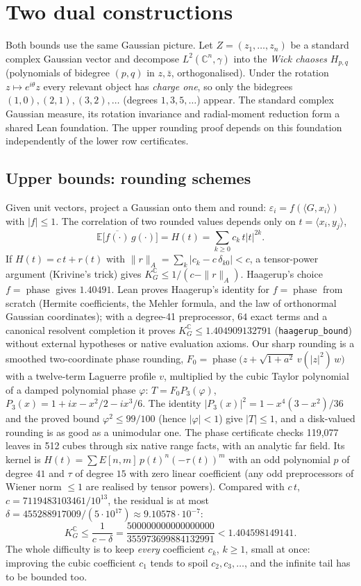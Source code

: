 \documentclass[11pt,a4paper]{article}
\newcommand{\C}{\mathbb{C}}
\newcommand{\E}{\mathbb{E}}
\newcommand{\KG}{K_G^{\C}}
\newcommand{\ph}{\operatorname{phase}}
\newcommand{\lean}[1]{\texttt{\small #1}}
\begin{document}
\section{Two dual constructions}
Both bounds use the same Gaussian picture. Let $Z=(z_1,\dots,z_n)$ be a standard complex Gaussian vector and decompose
$L^2(\C^n,\gamma)$ into the \emph{Wick chaoses} $H_{p,q}$ (polynomials of bidegree $(p,q)$ in $z,\bar z$, orthogonalised).
Under the rotation $z\mapsto e^{i\theta}z$ every relevant object has \emph{charge one}, so only the bidegrees
$(1,0),(2,1),(3,2),\dots$ (degrees $1,3,5,\dots$) appear.
The standard complex Gaussian measure, its rotation invariance and radial-moment reduction
form a shared Lean foundation. The upper rounding proof depends on this foundation
independently of the lower row certificates.

\subsection{Upper bounds: rounding schemes}
Given unit vectors, project a Gaussian onto them and round: $\varepsilon_i=f(\langle G,x_i\rangle)$ with $|f|\le1$. The
correlation of two rounded values depends only on $t=\langle x_i,y_j\rangle$,
\[
 \E\bigl[\overline{f(\cdot)}\,g(\cdot)\bigr]=H(t)=\sum_{k\ge0}c_k\,t|t|^{2k}.
\]
If $H(t)=c\,t+r(t)$ with $\|r\|_A=\sum_k|c_k-c\,\delta_{k0}|<c$, a tensor-power argument (Krivine's trick) gives
$\KG\le1/(c-\|r\|_A)$. Haagerup's choice $f=\ph$ gives $1.40491$. Lean proves Haagerup's identity for $f=\ph$ from scratch
(Hermite coefficients, the Mehler formula, and the law of orthonormal Gaussian coordinates); with a degree-41 preprocessor, $64$ exact terms and a canonical resolvent completion
it proves $\KG\le1.404909132791$ (\lean{haagerup\_bound}) without external hypotheses or native evaluation axioms. Our sharp rounding is a smoothed two-coordinate phase rounding,
$F_0=\ph\bigl(z+\sqrt{1+a^2}\,v(|z|^2)\,w\bigr)$ with a twelve-term Laguerre profile $v$, multiplied by the cubic Taylor
polynomial of a damped polynomial phase $\varphi$: $T=F_0P_3(\varphi)$, $P_3(x)=1+ix-x^2/2-ix^3/6$. The identity
$|P_3(x)|^2=1-x^4(3-x^2)/36$ and the proved bound $\varphi^2\le99/100$ (hence $|\varphi|<1$) give $|T|\le1$, and a disk-valued rounding is as good as a unimodular one.
The phase certificate checks 119,077 leaves in 512 cubes through six native range facts, with an analytic far field.
Its kernel is $H(t)=\sum E[n,m]\,p(t)^n(-\tau(t))^m$ with an odd polynomial $p$ of degree $41$ and
$\tau$ of degree $15$ with zero linear coefficient (any odd preprocessors of Wiener norm $\le1$ are realised by tensor
powers). Compared with $c\,t$, $c=7119483103461/10^{13}$, the residual is at most
$\delta=455288917009/(5\cdot10^{17})\approx9.10578\cdot10^{-7}$:
\[
 \KG\le\frac1{c-\delta}=\frac{500000000000000000}{355973699884132991}<1.404598149141 .
\]
The whole difficulty is to keep \emph{every} coefficient $c_k$, $k\ge1$, small at once: improving the cubic coefficient
$c_1$ tends to spoil $c_2,c_3,\dots$, and the infinite tail has to be bounded too.
\end{document}

